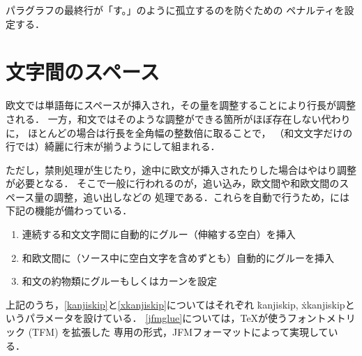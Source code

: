 \documentclass[a4paper,11pt,nomag,dvipdfmx]{jsarticle}
\def\_{\leavevmode\vrule width .45em height -.2ex depth .3ex\relax}
\begin{document}
\begin{cslist}
\csitem[\.{jcharwidowpenalty}=<number>]
  パラグラフの最終行が「す。」のように孤立するのを防ぐための
  ペナルティを設定する．
\end{cslist}

\section{文字間のスペース}

欧文では単語毎にスペースが挿入され，その量を調整することにより行長が調整される．
一方，和文ではそのような調整ができる箇所がほぼ存在しない代わりに，
ほとんどの場合は行長を全角幅の整数倍に取ることで，
（和文文字だけの行では）綺麗に行末が揃うようにして組まれる．

ただし，禁則処理が生じたり，途中に欧文が挿入されたりした場合はやはり調整が必要となる．
そこで一般に行われるのが，追い込み，欧文間や和欧文間のスペース量の調整，追い出しなどの
処理である．これらを自動で行うため，\pTeX には下記の機能が備わっている．
\begin{enumerate}
\item 連続する和文文字間に自動的にグルー（伸縮する空白）を挿入\label{kanjiskip}
\item 和欧文間に（ソース中に空白文字を含めずとも）自動的にグルーを挿入\label{xkanjiskip}
\item 和文の約物類にグルーもしくはカーンを設定\label{jfmglue}
\end{enumerate}
上記のうち，\ref{kanjiskip}と\ref{xkanjiskip}についてはそれぞれ
\.{kanjiskip}, \.{xkanjiskip}というパラメータを設けている．
\ref{jfmglue}については，\TeX が使うフォントメトリック (TFM) を拡張した
\pTeX 専用の形式，JFMフォーマットによって実現している．
\end{document}

